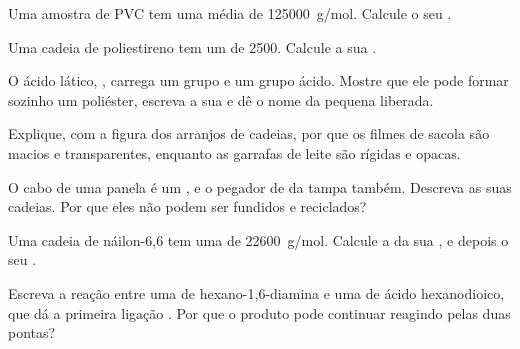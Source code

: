 \begin{exercise}[$\star\star$]\label{exo:g12:polymers:6}
Uma amostra de PVC tem uma  média de \qty{125000}{g/mol}.
Calcule o seu .
\end{exercise}

\begin{exercise}[$\star\star$]\label{exo:g12:polymers:7}
Uma cadeia de poliestireno tem um  de 2500. Calcule
a sua .
\end{exercise}

\begin{exercise}[$\star\star$]\label{exo:g12:polymers:8}
O ácido lático, , carrega um grupo  e um grupo
ácido. Mostre que ele pode formar sozinho um poliéster, escreva a sua
 e dê o nome da  pequena liberada.
\end{exercise}

\begin{exercise}[$\star\star$]\label{exo:g12:polymers:9}
Explique, com a figura dos arranjos de cadeias, por que os filmes de
sacola são macios e transparentes, enquanto as garrafas de leite são
rígidas e opacas.
\end{exercise}

\begin{exercise}[$\star\star$]\label{exo:g12:polymers:10}
O cabo de uma panela é um , e o pegador de  da tampa
também. Descreva as suas cadeias. Por que eles não podem ser fundidos e
reciclados?
\end{exercise}

\begin{exercise}[$\star\star$]\label{exo:g12:polymers:11}
Uma cadeia de náilon-6,6 tem uma  de \qty{22600}{g/mol}.
Calcule a  da sua  , e
depois o seu .
\end{exercise}

\begin{exercise}[$\star\star\star$]\label{exo:g12:polymers:12}
Escreva a reação entre uma  de hexano-1,6-diamina e uma de ácido
hexanodioico, que dá a primeira ligação . Por que o produto pode
continuar reagindo pelas duas pontas?
\end{exercise}

